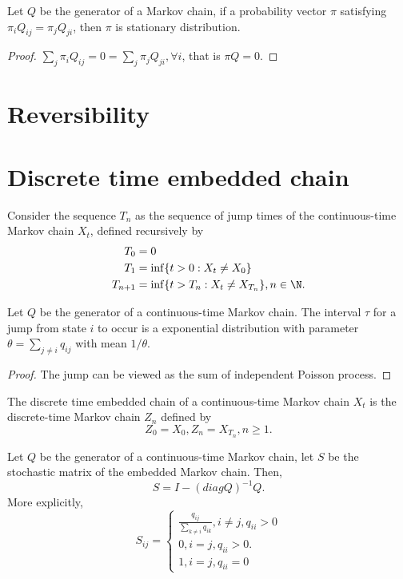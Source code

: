\begin{refsection}
\begin{lemma}
Let $Q$ be the generator of a Markov chain, if a probability vector $\pi$ satisfying 
$\pi_iQ_{ij} = \pi_j Q_{ji}$, then
$\pi$ is stationary distribution. 
\end{lemma}
\begin{proof}
	$\sum_j \pi_i Q_{ij} = 0 = \sum_j \pi_j Q_{ji},\forall i$, that is $\pi Q = 0$.
\end{proof}

\section{Reversibility}


\section{Discrete time embedded chain}
\begin{definition}\cite[200]{privault2013understanding}
Consider the sequence $T_n$ as the sequence of jump times of the continuous-time Markov chain $X_t$, defined recursively by 
\begin{align*}
T_0 &= 0\\
T_1 &=\inf\{t>0:X_t\neq X_0\}\\
T_{n+1} &= \inf\{t>T_n: X_t\neq X_{T_n}\}, n\in \N.
\end{align*}
\end{definition}

\begin{lemma}
Let $Q$ be the generator of a continuous-time Markov chain. The interval $\tau$ for a jump from state $i$ to occur is a exponential distribution with parameter $\theta = \sum_{j\neq i}q_{ij}$ with mean 
$1/\theta$.
\end{lemma}
\begin{proof}
The jump can be viewed as the sum of independent Poisson process.
\end{proof}


\begin{definition}
The discrete time embedded chain of a continuous-time Markov chain $X_t$ is the discrete-time Markov chain $Z_n$ defined by $$Z_0 = X_0, Z_n = X_{T_n}, n\geq 1.$$
\end{definition}

\begin{lemma}\cite[218]{He2007stochastic}
Let $Q$ be the generator of a continuous-time Markov chain, let $S$ be the stochastic matrix of the embedded Markov chain. Then,
$$S = I - (diag Q)^{-1}Q.$$
More explicitly, 
$$S_{ij} = \begin{cases}
\frac{q_{ij}}{\sum_{k\neq i} q_{ik}}, i\neq j, q_{ii} > 0\\
0, i = j, q_{ii} > 0.\\
1, i=j,q_{ii} = 0
\end{cases}$$
\end{lemma}


\end{refsection}
